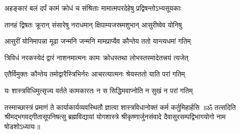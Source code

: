 \twolineshloka
{अहङ्कारं बलं दर्पं कामं क्रोधं च संश्रिताः}
{मामात्मपरदेहेषु प्रद्विषन्तोऽभ्यसूयकाः}%

\twolineshloka
{तानहं द्विषतः क्रूरान् संसारेषु नराधमान्}
{क्षिपाम्यजस्रमशुभान् आसुरीष्वेव योनिषु}%

\twolineshloka
{आसुरीं योनिमापन्ना मूढा जन्मनि जन्मनि}
{मामप्राप्यैव कौन्तेय ततो यान्त्यधमां गतिम्}%

\twolineshloka
{त्रिविधं नरकस्येदं द्वारं नाशनमात्मनः}
{कामः क्रोधस्तथा लोभस्तस्मादेतत्त्रयं त्यजेत्}%

\twolineshloka
{एतैर्विमुक्तः कौन्तेय तमोद्वारैस्त्रिभिर्नरः}
{आचरत्यात्मनः श्रेयस्ततो याति परां गतिम्}%

\twolineshloka
{यः शास्त्रविधिमुत्सृज्य वर्तते कामकारतः}
{न स सिद्धिमवाप्नोति न सुखं न परां गतिम्}%

\twolineshloka
{तस्माच्छास्त्रं प्रमाणं ते कार्याकार्यव्यवस्थितौ}
{ज्ञात्वा शास्त्रविधानोक्तं कर्म कर्तुमिहार्हसि}%
{॥ॐ तत्सदिति श्रीमद्भगवद्गीतासूपनिषत्सु ब्रह्मविद्यायां योगशास्त्रे श्रीकृष्णार्जुनसंवादे दैवासुरसम्पद्विभागयोगो नाम षोडशोऽध्यायः॥}